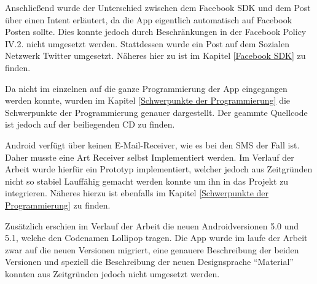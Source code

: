Anschlie\ss{}end wurde der Unterschied zwischen dem Facebook \ac{SDK} und dem Post \"uber einen Intent erl\"autert, da die App eigentlich automatisch auf Facebook Posten sollte. Dies konnte jedoch durch Beschr\"ankungen in der Facebook Policy IV.2. nicht umgesetzt werden. Stattdessen wurde ein Post auf dem Sozialen Netzwerk Twitter umgesetzt. N\"aheres hier zu ist im Kapitel \ref{Facebook SDK} zu finden.

Da nicht im einzelnen auf die ganze Programmierung der App eingegangen werden konnte, wurden im Kapitel \ref{Schwerpunkte der Programmierung} die Schwerpunkte der Programmierung genauer dargestellt. Der geammte Quellcode ist jedoch auf der beiliegenden CD zu finden.

Android verf\"ugt \"uber keinen E-Mail-Receiver, wie es bei den SMS der Fall ist. Daher musste eine Art Receiver selbst Implementiert werden. Im Verlauf der Arbeit wurde hierf\"ur ein Prototyp implementiert, welcher jedoch aus Zeitgr\"unden nicht so stabiel Lauff\"ahig gemacht werden konnte um ihn in das Projekt zu integrieren. N\"aheres hierzu ist ebenfalls im Kapitel \ref{Schwerpunkte der Programmierung} zu finden.

Zus\"atzlich erschien im Verlauf der Arbeit die neuen Androidversionen 5.0 und 5.1, welche den Codenamen Lollipop tragen. Die App wurde im laufe der Arbeit zwar auf die neuen Versionen migriert, eine genauere Beschreibung der beiden Versionen und speziell die Beschreibung der neuen Designsprache "`Material"' konnten aus Zeitgr\"unden jedoch nicht umgesetzt werden.

